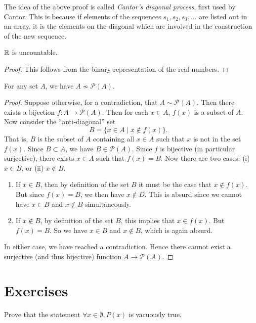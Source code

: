 \begin{remark}
The idea of the above proof is called \emph{Cantor's diagonal process}, first used by Cantor. This is because if elements of the sequences $s_1,s_2,s_3,\dots$ are listed out in an array, it is the elements on the diagonal which are involved in the construction of the new sequence.
\end{remark}

\begin{corollary}
$\mathbb R$ is uncountable.
\end{corollary}

\begin{proof}
This follows from the binary representation of the real numbers.
\end{proof}

\begin{theorem}
For any set $A$, we have $A\not\sim\mathcal{P}(A)$.
\end{theorem}

\begin{proof}
Suppose otherwise, for a contradiction, that $A\sim\mathcal{P}(A)$. Then there exists a bijection $f\colon A\to\mathcal{P}(A)$. Then for each $x\in A$, $f(x)$ is a subset of $A$. Now consider the ``anti-diagonal'' set
\[B=\{x\in A\mid x\notin f(x)\}.\]
That is, $B$ is the subset of $A$ containing all $x\in A$ such that $x$ is not in the set $f(x)$. Since $B\subset A$, we have $B\in\mathcal{P}(A)$. Since $f$ is bijective (in particular surjective), there exists $x\in A$ such that $f(x)=B$. Now there are two cases: (i) $x\in B$, or (ii) $x\notin B$.
\begin{enumerate}[label=(\roman*)]
\item If $x\in B$, then by definition of the set $B$ it must be the case that $x\notin f(x)$. But since $f(x)=B$, we then have $x\notin D$. This is absurd since we cannot have $x\in B$ and $x\notin B$ simultaneously.
\item If $x\notin B$, by definition of the set $B$, this implies that $x\in f(x)$. But $f(x)=B$. So we have $x\in B$ and $x\notin B$, which is again absurd.
\end{enumerate}
In either case, we have reached a contradiction. Hence there cannot exist a surjective (and thus bijective) function $A\to\mathcal{P}(A)$.
\end{proof}
\pagebreak

\section*{Exercises}
\begin{exercise}
Prove that the statement $\forall x\in\emptyset, P(x)$ is vacuously true.
\end{exercise}

